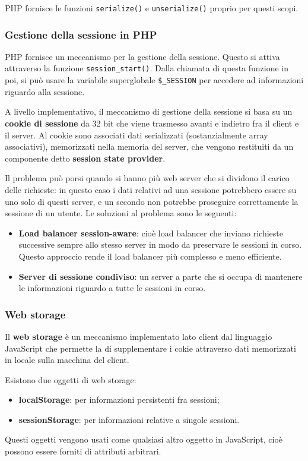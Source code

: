 \documentclass[a4paper,11pt]{article}
\begin{document}
PHP fornisce le funzioni \lstinline|serialize()| e \lstinline|unserialize()| proprio per questi scopi.

\subsubsection{Gestione della sessione in PHP}
PHP fornisce un meccanismo per la gestione della sessione.
Questo si attiva attraverso la funzione \lstinline|session_start()|.
Dalla chiamata di questa funzione in poi, si può usare la variabile superglobale \lstinline|$_SESSION| per accedere ad informazioni riguardo alla sessione.

A livello implementativo, il meccanismo di gestione della sessione si basa su un \textbf{cookie di sessione} da 32 bit che viene trasmesso avanti e indietro fra il client e il server.
Al cookie sono associati dati serializzati (sostanzialmente array associativi), memorizzati nella memoria del server, che vengono restituiti da un componente detto \textbf{session state provider}.

Il problema può porsi quando si hanno più web server che si dividono il carico delle richieste: in questo caso i dati relativi ad una sessione potrebbero essere su uno solo di questi server, e un secondo non potrebbe proseguire correttamente la sessione di un utente.
Le soluzioni al problema sono le seguenti:
\begin{itemize}
	\item \textbf{Load balancer session-aware}: cioè load balancer che inviano richieste successive sempre allo stesso server in modo da preservare le sessioni in corso.
		Questo approccio rende il load balancer più complesso e meno efficiente.
	\item \textbf{Server di sessione condiviso}: un server a parte che si occupa di mantenere le informazioni riguardo a tutte le sessioni in corso.
\end{itemize}

\subsubsection{Web storage}
Il \textbf{web storage} è un meccanismo implementato lato client dal linguaggio JavaScript che permette la di supplementare i cokie attraverso dati memorizzati in locale sulla macchina del client.

Esistono due oggetti di web storage:
\begin{itemize}
	\item \textbf{localStorage}: per informazioni persistenti fra sessioni;
	\item \textbf{sessionStorage}: per informazioni relative a singole sessioni.
\end{itemize}

Questi oggetti vengono usati come qualsiasi altro oggetto in JavaScript, cioè possono essere forniti di attributi arbitrari.
\end{document}
